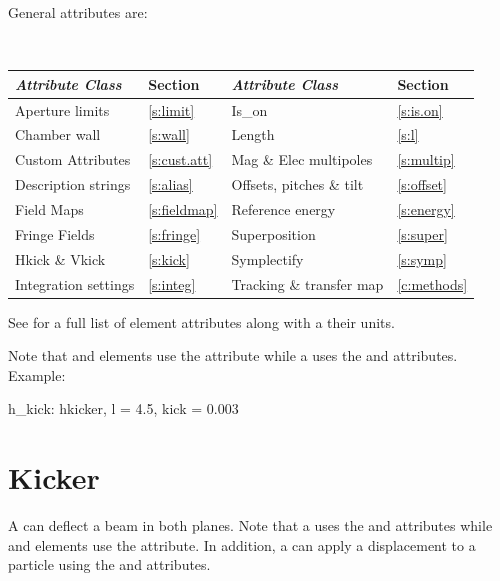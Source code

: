 General   attributes are:
\begin{center}
\tt
\begin{tabular}{llll} \toprule
  {\sl Attribute Class}      & Section           & {\sl Attribute Class}      & Section         \\ \midrule
  Aperture limits            & \ref{s:limit}     & Is_on                      & \ref{s:is.on}   \\
  Chamber wall               & \ref{s:wall}      & Length                     & \ref{s:l}       \\
  Custom Attributes          & \ref{s:cust.att}  & Mag \& Elec multipoles     & \ref{s:multip}  \\
  Description strings        & \ref{s:alias}     & Offsets, pitches \& tilt   & \ref{s:offset}  \\
  Field Maps                 & \ref{s:fieldmap}  & Reference energy           & \ref{s:energy}  \\ 
  Fringe Fields              & \ref{s:fringe}    & Superposition              & \ref{s:super}   \\
  Hkick \& Vkick             & \ref{s:kick}      & Symplectify                & \ref{s:symp}    \\
  Integration settings       & \ref{s:integ}     & Tracking \& transfer map   & \ref{c:methods} \\
  \bottomrule
\end{tabular}
\end{center}
\toffset
See  for a full list of element attributes along with a their units.

Note that  and  elements use the
 attribute while a  uses the  and  
attributes. Example:
\begin{example}
  h_kick: hkicker, l = 4.5, kick = 0.003
\end{example}

\section{Kicker}
\label{s:kicker}

A  can deflect a beam in both planes. Note that a  uses the  and
 attributes while  and  elements use the  attribute.  In
addition, a  can apply a displacement to a particle using the  and
 attributes.

